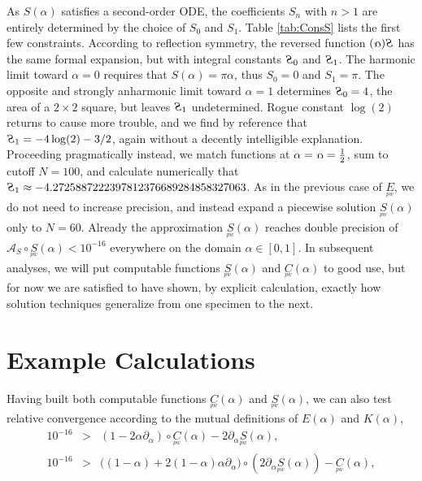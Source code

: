 \documentclass[nofootinbib,preprint]{revtex4-1}
\newcommand{\rev}[1]{\text{\reflectbox{$#1$}}}
\begin{document}
\noindent As $S(\alpha)$ satisfies a second-order ODE, the coefficients $S_n$ with $n>1$ are entirely determined
by the choice of $S_0$ and $S_1$. Table \ref{tab:ConsS} lists the first few constraints. 
According to reflection symmetry, the reversed function $\rev{S(\alpha)}$ has the same
formal expansion, but with integral constants $\rev{S}_0$ and $\rev{S}_1$. The harmonic limit 
toward ${\alpha=0}$
requires that  $S(\alpha)=\pi \alpha$, thus ${S_0=0}$ and $S_1=\pi$. The opposite and strongly 
anharmonic limit toward ${\alpha=1}$ determines ${\rev{S}_0=4}$, 
the area of a $2\times2$ square, but leaves $\rev{S}_1$ undetermined. 
Rogue constant $\log(2)$ returns to 
cause more trouble, and we find by reference that ${\rev{S}_1 = -4\log(2)-3/2}$, 
again without a decently intelligible explanation. Proceeding pragmatically
instead, we match functions at $\alpha = \rev{\alpha}=\frac{1}{2}$, sum to cutoff $N=100$,
and calculate numerically that ${\rev{S}_1 \approx -4.2725887222397812376689284858327063}$.
As in the previous case of $\underset{^{pw}}{E}$, we do not need to increase precision, and instead 
expand a piecewise solution $\underset{^{pw}}{S}(\alpha)$ 
only to $N=60$. Already the approximation $\underset{^{pw}}{S}(\alpha)$ reaches double precision of 
${\mathcal{A}_S \circ \underset{^{pw}}{S}(\alpha) <10^{-16}}$ everywhere on the domain 
$\alpha \in [0,1]$. In subsequent analyses, we will put computable functions 
$\underset{^{pw}}{S}(\alpha)$ and $\underset{^{pw}}{C}(\alpha)$ to good use, but for 
now we are satisfied to have shown, by explicit calculation, exactly how solution techniques 
generalize from one specimen to the next.

\section{Example Calculations}
Having built both computable functions $\underset{^{pw}}{C}(\alpha)$ and 
$\underset{^{pw}}{S}(\alpha)$, we can also test relative convergence
according to the mutual definitions of $E(\alpha)$ and $K(\alpha)$,
\begin{eqnarray}
  10^{-16} &>& (1-2\alpha \partial_{\alpha})\circ \underset{^{pw}}{C}(\alpha) 
- 2\partial_{\alpha}\underset{^{pw}}{S}(\alpha) , \nonumber \\
  10^{-16} &>& \big( (1-\alpha) + 2(1-\alpha)\alpha \partial_{\alpha} \big) \circ (2\partial_{\alpha}\underset{^{pw}}{S}(\alpha))
-\underset{^{pw}}{C}(\alpha), \nonumber
\end{eqnarray}
\end{document}
